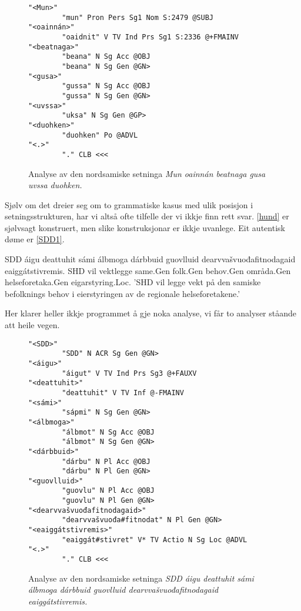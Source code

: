\documentclass[a4paper,norsk]{article}
\begin{document}
\begin{figure}[htbp]
\begin{center}
\begin{verbatim}
"<Mun>" 
        "mun" Pron Pers Sg1 Nom S:2479 @SUBJ
"<oainnán>"
        "oaidnit" V TV Ind Prs Sg1 S:2336 @+FMAINV
"<beatnaga>"
        "beana" N Sg Acc @OBJ
        "beana" N Sg Gen @GN>
"<gusa>" 
        "gussa" N Sg Acc @OBJ
        "gussa" N Sg Gen @GN>
"<uvssa>"
        "uksa" N Sg Gen @GP>
"<duohken>"
        "duohken" Po @ADVL
"<.>"
        "." CLB <<<
\end{verbatim}
\caption{Analyse av den nordsamiske setninga \textit{Mun oainnán beatnaga gusa uvssa duohken.}}
\label{beatnaga}
\end{center}
\end{figure}

Sjølv om det dreier seg om to grammatiske kasus med ulik posisjon i setningsstrukturen, har vi altså ofte tilfelle der vi ikkje finn rett svar. \ref{hund} er sjølvsagt konstruert, men slike konstruksjonar er ikkje uvanlege. Eit autentisk døme er \ref{SDD1}. %

 \begin{example}\label{SDD1}
\gll SDD áigu deattuhit sámi álbmoga dárbbuid guovlluid dearvvašvuođafitnodagaid eaiggátstivremis.
      SHD vil vektlegge same.Gen folk.Gen behov.Gen områda.Gen helseforetaka.Gen eigarstyring.Loc.
\glt  'SHD vil legge vekt på den samiske befolknings behov i eierstyringen av de regionale helseforetakene.'
\glend
\end{example}

Her klarer heller ikkje programmet å gje noka analyse, vi får to analyser ståande att heile vegen. %

\begin{figure}[htbp]
\begin{center}
\begin{verbatim}
"<SDD>"
        "SDD" N ACR Sg Gen @GN>
"<áigu>"
        "áigut" V TV Ind Prs Sg3 @+FAUXV
"<deattuhit>"
        "deattuhit" V TV Inf @-FMAINV
"<sámi>"
        "sápmi" N Sg Gen @GN>
"<álbmoga>"
        "álbmot" N Sg Acc @OBJ
        "álbmot" N Sg Gen @GN>
"<dárbbuid>"
        "dárbu" N Pl Acc @OBJ
        "dárbu" N Pl Gen @GN>
"<guovlluid>"
        "guovlu" N Pl Acc @OBJ
        "guovlu" N Pl Gen @GN>
"<dearvvašvuođafitnodagaid>"
        "dearvvašvuođa#fitnodat" N Pl Gen @GN>
"<eaiggátstivremis>"
        "eaiggát#stivret" V* TV Actio N Sg Loc @ADVL
"<.>"
        "." CLB <<<
\end{verbatim}
\caption{Analyse av den nordsamiske setninga \textit{SDD áigu deattuhit sámi álbmoga dárbbuid guovlluid dearvvašvuođafitnodagaid eaiggátstivremis.}}
\label{SDD1-a}
\end{center}
\end{figure}
\end{document}
